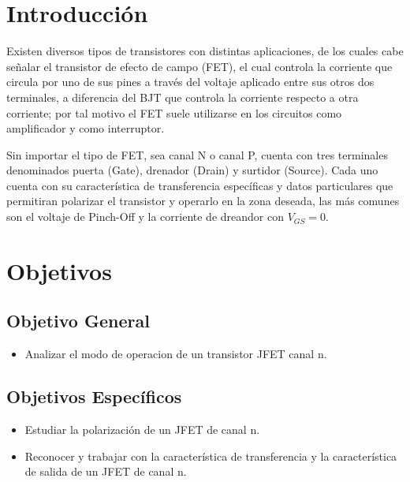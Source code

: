 \documentclass[12pt, a4paper]{article}
\begin{document}
    \newpage

    \section{Introducción}

    Existen diversos tipos de transistores con distintas aplicaciones, de los cuales cabe señalar el transistor de efecto de campo (FET), el cual controla la corriente que circula por uno de sus pines a través del voltaje aplicado entre sus otros dos terminales, a diferencia del BJT que controla la corriente respecto a otra corriente; por tal motivo el FET suele utilizarse en los circuitos como amplificador y como interruptor.

    Sin importar el tipo de FET, sea canal N o canal P, cuenta con tres terminales denominados puerta (Gate), drenador (Drain) y surtidor (Source). Cada uno cuenta con su característica de transferencia específicas y datos particulares que permitiran polarizar el transistor y operarlo en la zona deseada, las más comunes son el voltaje de Pinch-Off y la corriente de dreandor con $V_{GS} = 0$. 

    \newpage

    \section{Objetivos}
    
    \subsection{Objetivo General}
    \begin{itemize}
        \item Analizar el modo de operacion de un transistor JFET canal n. 
    \end{itemize}

    \subsection{Objetivos Específicos}
    \begin{itemize}
        \item Estudiar la polarización de un JFET de canal n.
        \item Reconocer y trabajar con la característica de transferencia y la característica de salida de un JFET de canal n.
    \end{itemize}

    \newpage
\end{document}
